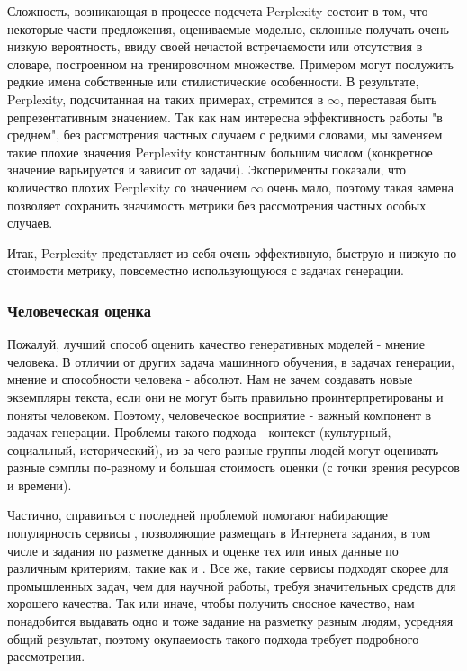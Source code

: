\documentclass{spbau-diploma}
\begin{document}
Сложность, возникающая в процессе подсчета Perplexity состоит в том, что 
некоторые части предложения, оцениваемые моделью, склонные получать очень 
низкую вероятность, ввиду своей нечастой встречаемости или отсутствия в 
словаре, построенном на тренировочном множестве. Примером могут послужить редкие 
имена собственные или стилистические особенности. В результате, Perplexity, 
подсчитанная на таких примерах, стремится в $\infty$, переставая быть 
репрезентативным значением. Так как нам интересна эффективность работы "в 
среднем", без рассмотрения частных случаем с редкими словами, мы заменяем 
такие плохие значения Perplexity константным большим числом (конкретное 
значение варьируется и зависит от задачи). Эксперименты показали, что количество
плохих Perplexity со значением $\infty$ очень мало, поэтому такая замена 
позволяет сохранить значимость метрики без рассмотрения частных особых случаев.

Итак, Perplexity представляет из себя очень эффективную, быструю и низкую по
стоимости метрику, повсеместно использующуюся с задачах генерации.

\subsubsection{Человеческая оценка}
Пожалуй, лучший способ оценить качество генеративных моделей - мнение человека.
В отличии от других задача машинного обучения, в задачах генерации, мнение и 
способности человека - абсолют. Нам не зачем создавать новые экземпляры текста, 
если они не могут быть правильно проинтерпретированы и поняты человеком. 
Поэтому, человеческое восприятие - важный компонент в задачах генерации. 
Проблемы такого подхода - контекст (культурный, социальный, исторический), из-за
чего разные группы людей могут оценивать разные сэмплы по-разному и большая
стоимость оценки (с точки зрения ресурсов и времени).

Частично, справиться с последней проблемой помогают набирающие популярность сервисы
, позволяющие размещать в Интернета задания, в том числе и задания по разметке
данных и оценке тех или иных данные по различным критериям, такие как 
\cite{yatoloka} и \cite{mturk}. Все же, такие сервисы подходят скорее для 
промышленных задач, чем для научной работы, требуя значительных средств для 
хорошего качества. Так или иначе, чтобы получить сносное качество, нам 
понадобится выдавать одно и тоже задание на разметку разным людям, усредняя
общий результат, поэтому окупаемость такого подхода требует подробного 
рассмотрения.
\end{document}

